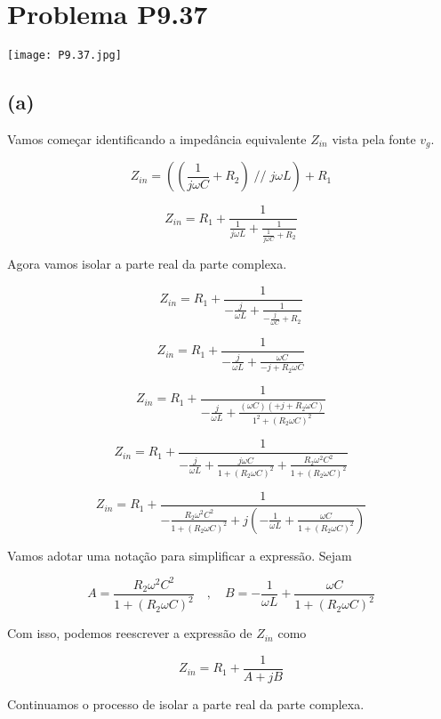 \section*{Problema P9.37}

\renewcommand*\thesection{9.37}

\begin{center}
    \texttt{[image: P9.37.jpg]}
\end{center}

\subsection*{(a)}

Vamos começar identificando a impedância equivalente \( Z_{in} \) vista pela fonte \( v_g \).

\[ Z_{in} = \left(\left(\frac{1}{j\omega C} + R_2\right) \; // \; j\omega L\right) +  R_1 \]

\[ Z_{in} = R_1 + \frac{1}{\frac{1}{j\omega L} + \frac{1}{\frac{1}{j\omega C} + R_2}}  \]

Agora vamos isolar a parte real da parte complexa.

\[ Z_{in} = R_1 + \frac{1}{-\frac{j}{\omega L} + \frac{1}{-\frac{j}{\omega C} + R_2}}  \]

\[ Z_{in} = R_1 + \frac{1}{-\frac{j}{\omega L} + \frac{\omega C}{-j + R_2\omega C}}  \]

\[ Z_{in} = R_1 + \frac{1}{-\frac{j}{\omega L} + \frac{(\omega C)(+j + R_2\omega C)}{1^2 + (R_2\omega C)^2}}  \]

\[ Z_{in} = R_1 + \frac{1}{-\frac{j}{\omega L} + \frac{j\omega C}{1 + (R_2\omega C)^2} + \frac{R_2\omega^2C^2}{1 + (R_2\omega C)^2} }  \]

\[ Z_{in} = R_1 + \frac{1}{- \frac{R_2\omega^2C^2}{1 + (R_2\omega C)^2} + j\left(-\frac{1}{\omega L} + \frac{\omega C}{1 + (R_2\omega C)^2} \right) }  \]


Vamos adotar uma notação para simplificar a expressão. Sejam

\[ 
    A = \frac{R_2\omega^2C^2}{1 + (R_2\omega C)^2}
    \quad , \quad
    B = - \frac{1}{\omega L} + \frac{\omega C}{1 + (R_2\omega C)^2}
\]

Com isso, podemos reescrever a expressão de \( Z_{in} \) como

\[ Z_{in} = R_1 + \frac{1}{A + jB}  \]

Continuamos o processo de isolar a parte real da parte complexa.


